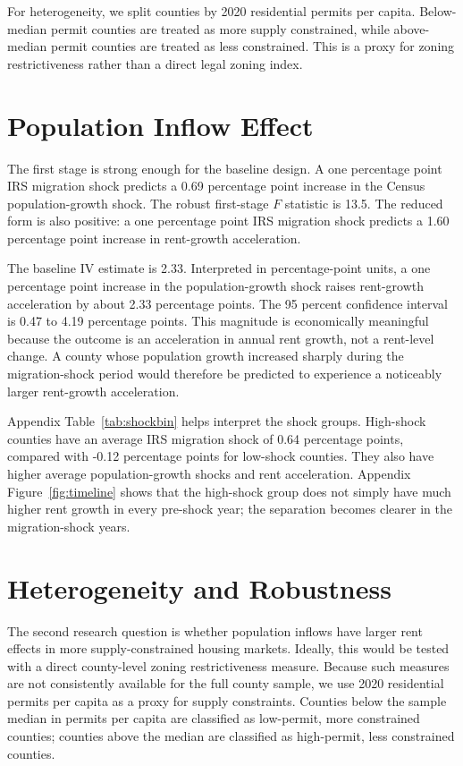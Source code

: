 \documentclass[11pt]{article}
\begin{document}
For heterogeneity, we split counties by 2020 residential permits per capita. Below-median permit counties are treated as more supply constrained, while above-median permit counties are treated as less constrained. This is a proxy for zoning restrictiveness rather than a direct legal zoning index.

\section{Population Inflow Effect}

The first stage is strong enough for the baseline design. A one percentage point IRS migration shock predicts a 0.69 percentage point increase in the Census population-growth shock. The robust first-stage $F$ statistic is 13.5. The reduced form is also positive: a one percentage point IRS migration shock predicts a 1.60 percentage point increase in rent-growth acceleration.

The baseline IV estimate is 2.33. Interpreted in percentage-point units, a one percentage point increase in the population-growth shock raises rent-growth acceleration by about 2.33 percentage points. The 95 percent confidence interval is 0.47 to 4.19 percentage points. This magnitude is economically meaningful because the outcome is an acceleration in annual rent growth, not a rent-level change. A county whose population growth increased sharply during the migration-shock period would therefore be predicted to experience a noticeably larger rent-growth acceleration.

Appendix Table~\ref{tab:shockbin} helps interpret the shock groups. High-shock counties have an average IRS migration shock of 0.64 percentage points, compared with -0.12 percentage points for low-shock counties. They also have higher average population-growth shocks and rent acceleration. Appendix Figure~\ref{fig:timeline} shows that the high-shock group does not simply have much higher rent growth in every pre-shock year; the separation becomes clearer in the migration-shock years.

\section{Heterogeneity and Robustness}

The second research question is whether population inflows have larger rent effects in more supply-constrained housing markets. Ideally, this would be tested with a direct county-level zoning restrictiveness measure. Because such measures are not consistently available for the full county sample, we use 2020 residential permits per capita as a proxy for supply constraints. Counties below the sample median in permits per capita are classified as low-permit, more constrained counties; counties above the median are classified as high-permit, less constrained counties.
\end{document}
